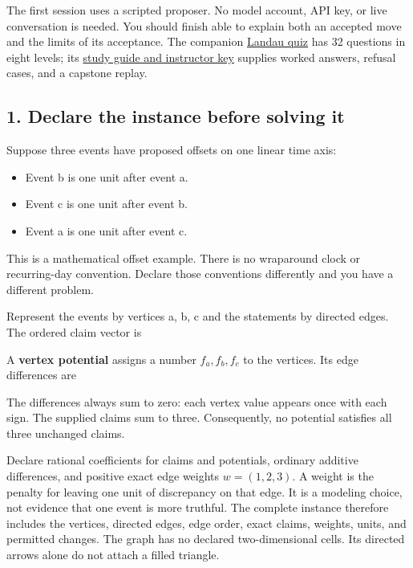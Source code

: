 \documentclass[
  11pt,
]{article}
\providecommand{\tightlist}{%
  \setlength{\itemsep}{0pt}\setlength{\parskip}{0pt}}
\newcommand{\PfpDisplayMath}[1]{%
  \sbox{\PfpMathBox}{$\displaystyle #1$}%
  \ifdim\wd\PfpMathBox>\linewidth
    \resizebox{\linewidth}{!}{\usebox{\PfpMathBox}}%
  \else\usebox{\PfpMathBox}\fi}
\begin{document}
The first session uses a scripted proposer. No model account, API key,
or live conversation is needed. You should finish able to explain both
an accepted move and the limits of its acceptance. The companion
\href{_lev_landau_theoretical_minimum_quiz/quiz.md}{Landau quiz} has 32
questions in eight levels; its
\href{_lev_landau_theoretical_minimum_quiz/study_guide.md}{study guide
and instructor key} supplies worked answers, refusal cases, and a
capstone replay.

\subsection{1. Declare the instance before solving
it}\label{declare-the-instance-before-solving-it}

Suppose three events have proposed offsets on one linear time axis:

\begin{itemize}
\tightlist
\item
  Event b is one unit after event a.
\item
  Event c is one unit after event b.
\item
  Event a is one unit after event c.
\end{itemize}

This is a mathematical offset example. There is no wraparound clock or
recurring-day convention. Declare those conventions differently and you
have a different problem.

Represent the events by vertices a, b, c and the statements by directed
edges. The ordered claim vector is

\begin{center}\PfpDisplayMath{
c=(c_{ab},c_{bc},c_{ca})=(1,1,1).
}\end{center}

A \textbf{vertex potential} assigns a number
\(f_a,\allowbreak f_b,\allowbreak f_c\) to the vertices. Its edge
differences are

\begin{center}\PfpDisplayMath{
df=(f_b-f_a,\ f_c-f_b,\ f_a-f_c).
}\end{center}

The differences always sum to zero: each vertex value appears once with
each sign. The supplied claims sum to three. Consequently, no potential
satisfies all three unchanged claims.

Declare rational coefficients for claims and potentials, ordinary
additive differences, and positive exact edge weights
\(w=(1,\allowbreak 2,\allowbreak 3)\). A weight is the penalty for
leaving one unit of discrepancy on that edge. It is a modeling choice,
not evidence that one event is more truthful. The complete instance
therefore includes the vertices, directed edges, edge order, exact
claims, weights, units, and permitted changes. The graph has no declared
two-dimensional cells. Its directed arrows alone do not attach a filled
triangle.
\end{document}
